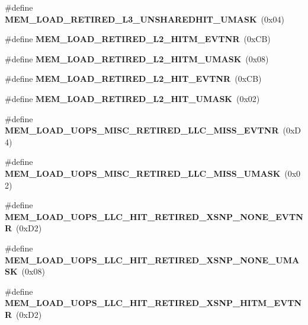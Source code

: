 \begin{DoxyCompactItemize}
\item 
\mbox{\label{types_8h_a82af69ba17f2c14d73f672e6ab64392d}} 
\#define {\bfseries M\+E\+M\+\_\+\+L\+O\+A\+D\+\_\+\+R\+E\+T\+I\+R\+E\+D\+\_\+\+L3\+\_\+\+U\+N\+S\+H\+A\+R\+E\+D\+H\+I\+T\+\_\+\+U\+M\+A\+SK}~(0x04)
\item 
\mbox{\label{types_8h_a4fa3ebccc930b769a6fab108e11d98a1}} 
\#define {\bfseries M\+E\+M\+\_\+\+L\+O\+A\+D\+\_\+\+R\+E\+T\+I\+R\+E\+D\+\_\+\+L2\+\_\+\+H\+I\+T\+M\+\_\+\+E\+V\+T\+NR}~(0x\+C\+B)
\item 
\mbox{\label{types_8h_a425b82db02859d2176d1626972950617}} 
\#define {\bfseries M\+E\+M\+\_\+\+L\+O\+A\+D\+\_\+\+R\+E\+T\+I\+R\+E\+D\+\_\+\+L2\+\_\+\+H\+I\+T\+M\+\_\+\+U\+M\+A\+SK}~(0x08)
\item 
\mbox{\label{types_8h_ab0383f3dadd106b0e563ad7459a4fc78}} 
\#define {\bfseries M\+E\+M\+\_\+\+L\+O\+A\+D\+\_\+\+R\+E\+T\+I\+R\+E\+D\+\_\+\+L2\+\_\+\+H\+I\+T\+\_\+\+E\+V\+T\+NR}~(0x\+C\+B)
\item 
\mbox{\label{types_8h_a74427facc02a83299c443b9b6e424cc1}} 
\#define {\bfseries M\+E\+M\+\_\+\+L\+O\+A\+D\+\_\+\+R\+E\+T\+I\+R\+E\+D\+\_\+\+L2\+\_\+\+H\+I\+T\+\_\+\+U\+M\+A\+SK}~(0x02)
\item 
\mbox{\label{types_8h_ab964a48398e98cbc7d1a7d08937a5c06}} 
\#define {\bfseries M\+E\+M\+\_\+\+L\+O\+A\+D\+\_\+\+U\+O\+P\+S\+\_\+\+M\+I\+S\+C\+\_\+\+R\+E\+T\+I\+R\+E\+D\+\_\+\+L\+L\+C\+\_\+\+M\+I\+S\+S\+\_\+\+E\+V\+T\+NR}~(0x\+D4)
\item 
\mbox{\label{types_8h_a80c955ec4c26781b4be38c9acda01914}} 
\#define {\bfseries M\+E\+M\+\_\+\+L\+O\+A\+D\+\_\+\+U\+O\+P\+S\+\_\+\+M\+I\+S\+C\+\_\+\+R\+E\+T\+I\+R\+E\+D\+\_\+\+L\+L\+C\+\_\+\+M\+I\+S\+S\+\_\+\+U\+M\+A\+SK}~(0x02)
\item 
\mbox{\label{types_8h_a9cd79f19e709d1fe6974ceb31f00eaec}} 
\#define {\bfseries M\+E\+M\+\_\+\+L\+O\+A\+D\+\_\+\+U\+O\+P\+S\+\_\+\+L\+L\+C\+\_\+\+H\+I\+T\+\_\+\+R\+E\+T\+I\+R\+E\+D\+\_\+\+X\+S\+N\+P\+\_\+\+N\+O\+N\+E\+\_\+\+E\+V\+T\+NR}~(0x\+D2)
\item 
\mbox{\label{types_8h_a88b8dc5c922214445a1261b75fdadece}} 
\#define {\bfseries M\+E\+M\+\_\+\+L\+O\+A\+D\+\_\+\+U\+O\+P\+S\+\_\+\+L\+L\+C\+\_\+\+H\+I\+T\+\_\+\+R\+E\+T\+I\+R\+E\+D\+\_\+\+X\+S\+N\+P\+\_\+\+N\+O\+N\+E\+\_\+\+U\+M\+A\+SK}~(0x08)
\item 
\mbox{\label{types_8h_ae9f23b3173042a0c8efad2e54a38604e}} 
\#define {\bfseries M\+E\+M\+\_\+\+L\+O\+A\+D\+\_\+\+U\+O\+P\+S\+\_\+\+L\+L\+C\+\_\+\+H\+I\+T\+\_\+\+R\+E\+T\+I\+R\+E\+D\+\_\+\+X\+S\+N\+P\+\_\+\+H\+I\+T\+M\+\_\+\+E\+V\+T\+NR}~(0x\+D2)

\end{DoxyCompactItemize}
